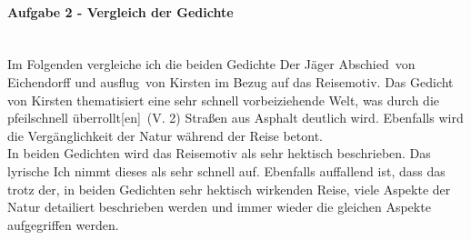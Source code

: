 \documentclass[11pt,a4paper]{report}
\begin{document}
	\paragraph{Aufgabe 2 - Vergleich der Gedichte} \mbox{} \\
	Im Folgenden vergleiche ich die beiden Gedichte \dq Der Jäger Abschied\dq\ von Eichendorff und \dq ausflug\dq\ von Kirsten im Bezug auf das \dq Reisemotiv\dq.
	Das Gedicht von Kirsten thematisiert eine sehr schnell vorbeiziehende Welt, was durch die \dq pfeilschnell überrollt[en]\dq\ (V. 2) Straßen aus Asphalt deutlich wird.
	Ebenfalls wird die Vergänglichkeit der Natur während der Reise betont. \\
	In beiden Gedichten wird das Reisemotiv als sehr hektisch beschrieben.
	Das lyrische Ich nimmt dieses als sehr schnell auf.
	Ebenfalls auffallend ist, dass das trotz der, in beiden Gedichten sehr hektisch wirkenden Reise, viele Aspekte der Natur detailiert beschrieben werden und immer wieder die gleichen Aspekte aufgegriffen werden.	
\end{document}
